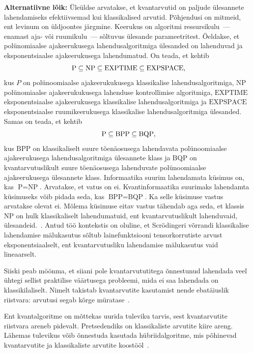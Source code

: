 \documentclass[12pt]{report}
\begin{document}
{\bf Alternatiivne lõik:}
Üleüldse arvatakse, et kvantarvutid on paljude ülesannete lahendamiseks efektiivsemad kui klassikalised arvutid.
Põhjendusi on mitmeid, ent levinum on üldjoontes järgmine.
Keerukus on algoritmi ressursikulu~--- enamast aja- või ruumikulu~--- sõltuvus ülesande parameetritest.
Öeldakse, et polünomiaalse ajakeerukusega lahendusalgoritmiga ülesanded on lahenduvad ja eksponentsiaalse ajakeerukusega lahendumatud.
On teada, et kehtib
\[
  \text{P}\subseteq\text{NP}\subseteq\text{EXPTIME}\subseteq\text{EXPSPACE}\rlap,
\]
kus \(P\) on polünoomiaalse ajakeerukukusega klassikalise lahendusalgoritmiga, \(\text{NP}\) polünomiaalse ajakeerukukusega lahenduse kontrollimise algoritmiga, \(\text{EXPTIME}\) eksponentsiaalse ajakeerukusega klassikalise lahendusalgoritmiga ja \(\text{EXPSPACE}\) eksponentsiaalse ruumikeerukusega klassikalise lahendusalgoritmiga ülesanded.
Samas on teada, et kehtib
\[
  \text{P}\subseteq\text{BPP}\subseteq\text{BQP}\rlap,
\]
kus \(\text{BPP}\) on klassikaliselt suure tõenäosusega lahendavata polünoomiaalse ajakeerukusega lahendusalgoritmiga ülesannete klass ja \(\text{BQP}\) on kvantarvutuslikult suure tõenäosusega lahenduvate polünoomiaalse ajakeerukusega ülesannete klass.
Informaatika suurim lahendamata küsimus on, kas \(\text{P}=\text{NP}\).
Arvatakse, et vatus on ei.
Kvantinformaatika suurimaks lahendamta küsimuseks võib pidada seda, kas \(\text{BPP}=\text{BQP}\).
Ka selle küsimuse vastus arvatakse olevat ei.
Mõlema küsimuse eitav vastus tähendab aga seda, et klassis \(\text{NP}\) on hulk klassikaliselt lahendumatuid, ent kvantarvutuslikult lahenduvaid, ülesandeid.~\cite{stanford, nielsen+chuang}.
Antud töö kontekstis on oluline, et Scrödingeri võrrandi klassikalise lahendamise mälukasutus sõltub lainefunktsiooni tensorkorrutiste arvust eksponentsiaalselt, ent kvantarvutusliku lahendamise mälukasutus vaid lineaarselt.~\cite{whitfield+etal2011, mcardle+etal, cao+etal, kassal+etal}

Siiski peab möönma, et siiani pole kvantarvututitega õnnestunud lahendada veel ühtegi sellist praktilise väärtusega probleemi, mida ei saa lahendada on klassikilaliselt.
Nimelt takistab kvantarvutite kasutamist nende ebatäiuslik riistvara: arvutusi segab kõrge müratase~\cite{whitfield+etal2022}.

Ent kvantalgoritme on mõttekas uurida tuleviku tarvis, sest kvantarvutite riistvara areneb pidevalt.
Pretsedendiks on klassikaliste arvutite kiire areng.
Lähemas tulevikus võib õnnestuda kasutada hübriidalgoritme, mis põhinevad kvantarvutite ja klassikaliste arvutite koostööl~\cite{omalley+etal}.
\end{document}
